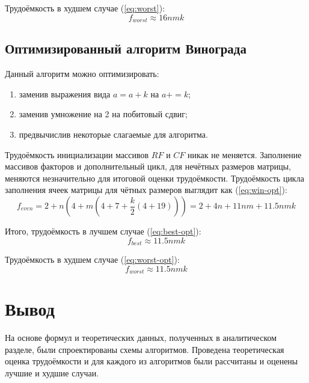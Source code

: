 Трудоёмкость в худшем случае (\ref{eq:worst}):
\begin{equation}
    \label{eq:worst}
    f_{worst} \approx 16nmk
\end{equation}

\subsection{Оптимизированный алгоритм Винограда}

Данный алгоритм можно оптимизировать:
\begin{enumerate}
	\item заменив выражения вида $a = a + k$ на $a += k$;
	\item заменив умножение на 2 на побитовый сдвиг;
	\item предвычислив некоторые слагаемые для алгоритма.
\end{enumerate}

Трудоёмкость инициализации массивов $RF$ и $CF$ никак не меняется.
Заполнение массивов факторов и дополнительный цикл, для нечётных размеров матрицы, меняются незначительно для итоговой оценки трудоёмкости.
Трудоёмкость цикла заполнения ячеек матрицы для чётных размеров выглядит как (\ref{eq:win-opt}):
\begin{equation}
    \label{eq:win-opt}
    f_{even} = 2 + n(4 + m(4 + 7 + \frac{k}{2}(4 + 19))) = 2 + 4n + 11nm + 11.5nmk
\end{equation}

Итого, трудоёмкость в лучшем случае (\ref{eq:best-opt}):
\begin{equation}
    \label{eq:best-opt}
    f_{best} \approx 11.5nmk
\end{equation}

Трудоёмкость в худшем случае (\ref{eq:worst-opt}):
\begin{equation}
    \label{eq:worst-opt}
    f_{worst} \approx 11.5nmk
\end{equation}

\section*{Вывод}

На основе формул и теоретических данных, полученных в аналитическом разделе, были спроектированы схемы алгоритмов.
Проведена теоретическая оценка трудоёмкости и для каждого из алгоритмов были рассчитаны и оценены лучшие и худшие случаи.
